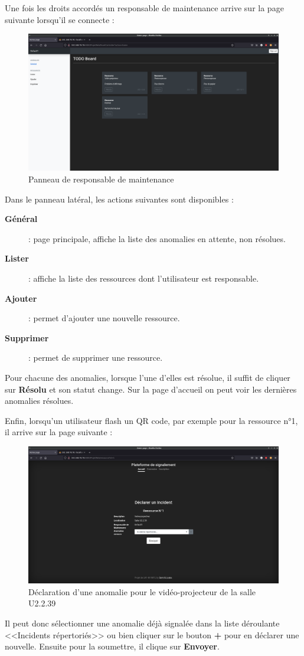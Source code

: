Une fois les droits accordés un responsable de maintenance arrive sur la page suivante lorsqu'il
se connecte :
\begin{figure}[!h]
    \centering
    \includegraphics[width=\textwidth]{img/maintainer.png}
    \caption{Panneau de responsable de maintenance}
\end{figure}

Dans le panneau latéral, les actions suivantes sont disponibles :
\begin{description}
    \item[\textbf{Général}] : page principale, affiche la liste des anomalies en attente, non
        résolues.
    \item[\textbf{Lister}] : affiche la liste des ressources dont l'utilisateur est responsable.
    \item[\textbf{Ajouter}] : permet d'ajouter une nouvelle ressource.
    \item[\textbf{Supprimer}] : permet de supprimer une ressource.
\end{description}
Pour chacune des anomalies, lorsque l'une d'elles est résolue, il suffit de cliquer sur
\textbf{Résolu} et son statut change. Sur la page d'accueil on peut voir les dernières anomalies
résolues.
\newpage

Enfin, lorsqu'un utilisateur flash un QR code, par exemple pour la ressource n°1, il arrive sur
la page suivante :
\begin{figure}[!h]
    \centering
    \includegraphics[width=\textwidth]{img/ressource.png}
    \caption{Déclaration d'une anomalie pour le vidéo-projecteur de la salle U2.2.39}
\end{figure}
Il peut donc sélectionner une anomalie déjà signalée dans la liste déroulante
<<Incidents répertoriés>> ou bien cliquer sur le bouton \textbf{+} pour en déclarer une nouvelle.
Ensuite pour la soumettre, il clique sur \textbf{Envoyer}.

